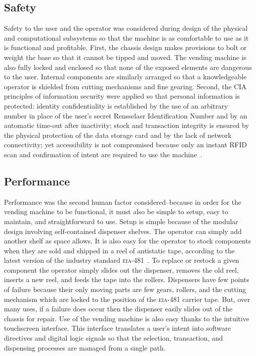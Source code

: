 \documentclass[12pt,oneside,final]{article}
\begin{document}
\subsection{Safety}
Safety to the user and the operator was considered during design of the physical and computational subsystems so that the machine is as comfortable to use as it is functional and profitable. First, the chassis design makes provisions to bolt or weight the base so that it cannot be tipped and moved. The vending machine is also fully locked and enclosed so that none of the exposed elements are dangerous to the user. Internal components are similarly arranged so that a knowledgeable operator is shielded from cutting mechanisms and fine gearing. Second, the CIA principles of information security were applied so that personal information is protected: identity confidentiality is established by the use of an arbitrary number in place of the user's secret Rensselaer Identification Number and by an automatic time-out after inactivity; stock and transaction integrity is ensured by the physical protection of the data storage card and by the lack of network connectivity; yet accessibility is not compromised because only an instant RFID scan and confirmation of intent are required to use the machine~\cite{cia}.

\subsection{Performance}
Performance was the second human factor considered--because in order for the vending machine to be functional, it must also be simple to setup, easy to maintain, and straightforward to use. Setup is simple because of the modular design involving self-contained dispenser shelves. The operator can simply add another shelf as space allows. It is also easy for the operator to stock components when they are sold and shipped in a reel of antistatic tape, according to the latest version of the industry standard \textsc{eia-481}~\cite{eia-481}. To replace or restock a given component the operator simply slides out the dispenser, removes the old reel, inserts a new reel, and feeds the tape into the rollers. Dispensers have few points of failure because their only moving parts are few gears, rollers, and the cutting mechanism which are locked to the position of the \textsc{eia-481} carrier tape. But, over many uses, if a failure does occur then the dispenser easily slides out of the chassis for repair. Use of the vending machine is also easy thanks to the intuitive touchscreen interface. This interface translates a user's intent into software directives and digital logic signals so that the selection, transaction, and dispensing processes are managed from a single path.
\end{document}
